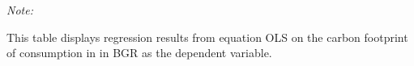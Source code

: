 \begin{table}[htbp!]
\begin{adjustbox}{width = 1\textwidth, max height = 0.95\textheight, center}
\begin{threeparttable}[b]
         \begin{tablenotes}\item \medskip \textit{Note:}
            \item This table displays regression results from equation OLS on the carbon footprint of consumption in  in BGR as the dependent variable.  
         \end{tablenotes}
      \end{threeparttable}
   \end{adjustbox}
\end{table}


